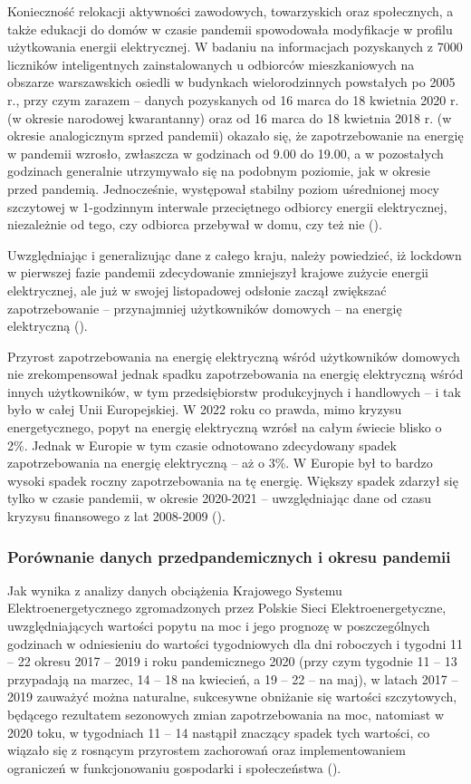 \documentclass[polish, twoside, 12pt, a4paper]{article}
\theoremstyle{definition}
\theoremstyle{plain}
\theoremstyle{remark}
\begin{document}
Konieczność relokacji aktywności zawodowych, towarzyskich oraz społecznych, a także edukacji do domów w czasie pandemii spowodowała modyfikacje w profilu użytkowania energii elektrycznej. W badaniu na informacjach pozyskanych z 7000 liczników inteligentnych zainstalowanych u odbiorców mieszkaniowych na obszarze warszawskich osiedli w budynkach wielorodzinnych powstałych po 2005 r., przy czym zarazem – danych pozyskanych od 16 marca do 18 kwietnia 2020 r. (w okresie narodowej kwarantanny) oraz od 16 marca do 18 kwietnia 2018 r. (w okresie analogicznym sprzed pandemii) okazało się, że zapotrzebowanie na energię w pandemii wzrosło, zwłaszcza w godzinach od 9.00 do 19.00, a w pozostałych godzinach generalnie utrzymywało się na podobnym poziomie, jak w okresie przed pandemią. Jednocześnie, występował stabilny poziom uśrednionej mocy szczytowej w 1-godzinnym interwale przeciętnego odbiorcy energii elektrycznej, niezależnie od tego, czy odbiorca przebywał w domu, czy też nie (\cite{artsmart2023}). 

Uwzględniając i generalizując dane z całego kraju, należy powiedzieć, iż lockdown w pierwszej fazie pandemii zdecydowanie zmniejszył krajowe zużycie energii elektrycznej, ale już w swojej listopadowej odsłonie zaczął zwiększać zapotrzebowanie – przynajmniej użytkowników domowych – na energię elektryczną (\cite{kazimierska2023}).

Przyrost zapotrzebowania na energię elektryczną wśród użytkowników domowych nie zrekompensował jednak spadku zapotrzebowania na energię elektryczną wśród innych użytkowników, w tym przedsiębiorstw produkcyjnych i handlowych – i tak było w całej Unii Europejskiej. W 2022 roku co prawda, mimo kryzysu energetycznego, popyt na energię elektryczną wzrósł na całym świecie blisko o 2\%. Jednak w Europie w tym czasie odnotowano zdecydowany spadek zapotrzebowania na energię elektryczną – aż o 3\%. W Europie był to bardzo wysoki spadek roczny zapotrzebowania na tę energię. Większy spadek zdarzył się tylko w czasie pandemii, w okresie 2020-2021 – uwzględniając dane od czasu kryzysu finansowego z lat 2008-2009 (\cite{maciuch2023}).  

\subsubsection{Porównanie danych przedpandemicznych i okresu pandemii}

Jak wynika z analizy danych obciążenia Krajowego Systemu Elektroenergetycznego zgromadzonych przez Polskie Sieci Elektroenergetyczne, uwzględniających wartości popytu na moc i jego prognozę w poszczególnych godzinach w odniesieniu do wartości tygodniowych dla dni roboczych i tygodni 11 – 22 okresu 2017 – 2019 i roku pandemicznego 2020 (przy czym tygodnie 11 – 13 przypadają na marzec, 14 – 18 na kwiecień, a 19 – 22 – na maj), w latach 2017 – 2019 zauważyć można naturalne, sukcesywne obniżanie się wartości szczytowych, będącego rezultatem sezonowych zmian zapotrzebowania na moc, natomiast w 2020 toku, w tygodniach 11 – 14 nastąpił znaczący spadek tych wartości, co wiązało się z rosnącym przyrostem zachorowań oraz implementowaniem ograniczeń w funkcjonowaniu gospodarki i społeczeństwa (\cite{stahl2021}). 
\end{document}
